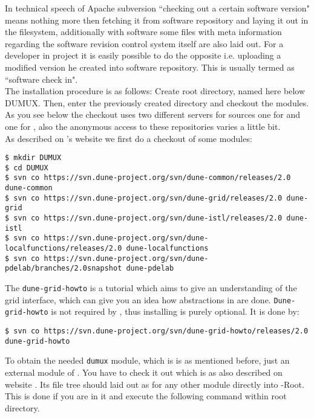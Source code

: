 In technical speech of Apache subversion ``checking out a certain software version" means nothing more then fetching 
it from software repository and laying it out in the filesystem, additionally with software some files with meta information regarding the software revision control system itself are also laid out.
For a developer in \Dumux project it is easily possible to do the opposite i.e. uploading a modified version he created into software repository. This is usually termed as ``software check in".\\

The installation procedure is as follows:
Create {\Dune} root directory, named here below DUMUX.
Then, enter the previously created directory and checkout the modules. 
As you see below the checkout uses two different servers for sources one for \Dune and one for \Dumux, also the 
anonymous access to these repositories varies a little bit.\\ 

As described on \Dune's website \cite{DUNE-DOWNLOAD-SVN} we first do a checkout of some \Dune modules:

\begin{lstlisting}[style=Bash]
$ mkdir DUMUX
$ cd DUMUX
$ svn co https://svn.dune-project.org/svn/dune-common/releases/2.0 dune-common
$ svn co https://svn.dune-project.org/svn/dune-grid/releases/2.0 dune-grid
$ svn co https://svn.dune-project.org/svn/dune-istl/releases/2.0 dune-istl
$ svn co https://svn.dune-project.org/svn/dune-localfunctions/releases/2.0 dune-localfunctions
$ svn co https://svn.dune-project.org/svn/dune-pdelab/branches/2.0snapshot dune-pdelab
\end{lstlisting}

The \texttt{dune-grid-howto} is a tutorial which aims to give an understanding of the \Dune grid interface, which can 
give you an idea how abstractions in \Dune are done. \texttt{Dune-grid-howto} is not required by \Dumux, thus installing is purely optional. It is done by: 

\begin{lstlisting}[style=Bash]
$ svn co https://svn.dune-project.org/svn/dune-grid-howto/releases/2.0 dune-grid-howto
\end{lstlisting}

To obtain the needed \texttt{dumux} module, which is is as mentioned before, just an external module of \Dune. You have to check it out which is as also described on \Dumux website \cite{DUMUX-HP}.
Its file tree should laid out as for any other \Dune module directly into \Dune-Root. This is done if you are in it and execute the following command within \Dune root directory.

